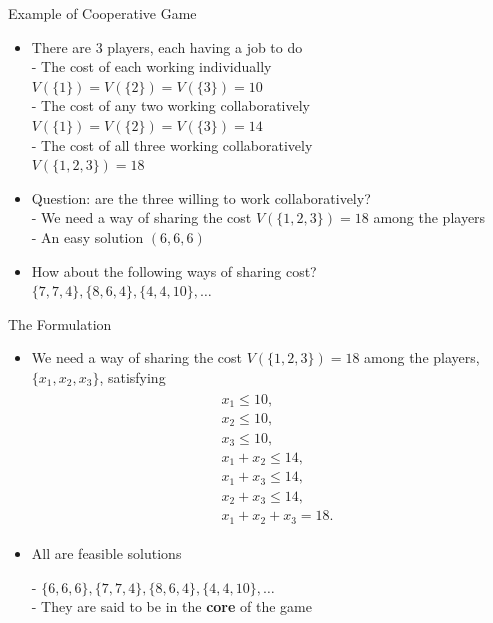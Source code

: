 \documentclass[14pt]{beamer}
\begin{document}
\begin{frame}{Example of Cooperative Game}
\begin{itemize}
\justifying
\small
	\item There are 3 players, each having a job to do\\
\footnotesize
  - The cost of each working individually \\
\qquad \qquad
 $V(\{1\}) = V(\{2\}) = V(\{3\}) = 10$ \\
  - The cost of any two working collaboratively \\
\qquad  \qquad
$V(\{1\}) = V(\{2\}) = V(\{3\}) = 14$ \\
  - The cost of all three working collaboratively  \\
\qquad  \qquad
$V(\{1,2,3\}) = 18$
\small
  \item Question: are the three willing to work collaboratively? \\
\footnotesize
  - We need a way of sharing the cost $V(\{1,2,3\}) = 18$ among the players \\
  - An easy solution $(6, 6, 6)$
\small
  \item How about the following ways of sharing cost? \\
\footnotesize
  $\{7,7,4\}, \{8,6,4\}, \{4,4,10\},\ldots$
\end{itemize}
\end{frame}


\begin{frame}{The Formulation}
\begin{itemize}
\justifying
\small
	\item We need a way of sharing the cost $V(\{1,2,3\}) = 18$ among the players,$\{x_1, x_2, x_3\}$, satisfying
    \vspace{-0.5em}
    \begin{eqnarray*}
      \begin{aligned}
    &x_1 \leq 10,  \\
    &x_2 \leq 10,  \\
    &x_3 \leq 10,  \\
    &x_1 + x_2 \leq 14, \\
    &x_1 + x_3 \leq 14, \\
    &x_2 + x_3 \leq 14, \\
    &x_1 + x_2 + x_3  = 18.
      \end{aligned}
    \end{eqnarray*}
  \vspace{-1.5em}

  \item All are feasible solutions \\
  \vspace{0.25em}

  - $\{6,6,6\},\{7,7,4\}, \{8,6,4\}, \{4,4,10\},\ldots$ \\
  - They are said to be in the \textbf{core} of the game

\end{itemize}
\end{frame}
\end{document}
